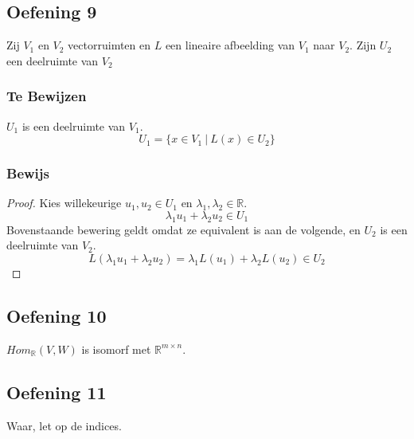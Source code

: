 \documentclass[lineaire_algebra_oplossingen.tex]{subfiles}
\begin{document}
\subsection{Oefening 9}
Zij $V_1$ en $V_2$ vectorruimten en $L$ een lineaire afbeelding van $V_1$ naar $V_2$. Zijn $U_2$ een deelruimte van $V_2$

\subsubsection*{Te Bewijzen}
$U_1$ is een deelruimte van $V_1$.
\[
U_1 = \{x \in V_1\ |\  L(x) \in U_2 \}
\]

\subsubsection*{Bewijs}
\begin{proof}
Kies willekeurige $u_1, u_2 \in U_1$ en $\lambda_1,\lambda_2 \in \mathbb{R}$.
\[
\lambda_1u_1 + \lambda_2u_2 \in U_1
\]
Bovenstaande bewering geldt omdat ze equivalent is aan de volgende, en $U_2$ is een deelruimte van $V_2$.
\[
L(\lambda_1u_1 + \lambda_2u_2)
=\lambda_1L(u_1) + \lambda_2L(u_2)
 \in U_2
\]
\end{proof}

\subsection{Oefening 10}
$Hom_{\mathbb{R}}(V,W)$ is isomorf met $\mathbb{R}^{m\times n}$.

\subsection{Oefening 11}
Waar, let op de indices.
\end{document}
